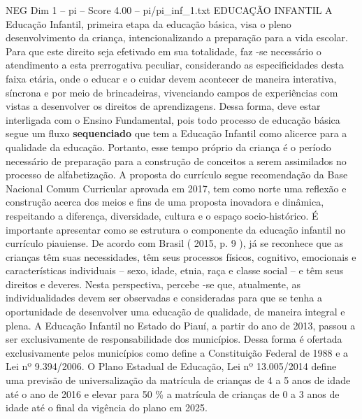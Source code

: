 \begin{textsample}{NEG Dim 1 – pi – Score 4.00 – pi/pi\_inf\_1.txt}  \label{ex:f1_neg_235}
EDUCAÇÃO INFANTIL A Educação Infantil, primeira etapa da educação básica, visa o pleno desenvolvimento da criança, intencionalizando a preparação para a vida escolar.
Para que este direito seja efetivado em sua totalidade, faz -se necessário o atendimento a esta prerrogativa peculiar, considerando as especificidades desta faixa etária, onde o educar e o cuidar devem acontecer de maneira interativa, síncrona e por meio de brincadeiras, vivenciando campos de experiências com vistas a desenvolver os direitos de aprendizagens.
Dessa forma, deve estar interligada com o Ensino Fundamental, pois todo processo de educação básica segue um fluxo \textbf{sequenciado} que tem a Educação Infantil como alicerce para a qualidade da educação.
Portanto, esse tempo próprio da criança é o período necessário de preparação para a construção de conceitos a serem assimilados no processo de alfabetização.
A proposta do currículo segue recomendação da Base Nacional Comum Curricular aprovada em 2017, tem como norte uma reflexão e construção acerca dos meios e fins de uma proposta inovadora e dinâmica, respeitando a diferença, diversidade, cultura e o espaço socio-histórico.
É importante apresentar como se estrutura o componente da educação infantil no currículo piauiense.
De acordo com Brasil ( 2015, p. 9 ), já se reconhece que as crianças têm suas necessidades, têm seus processos físicos, cognitivo, emocionais e características individuais – sexo, idade, etnia, raça e classe social – e têm seus direitos e deveres.
Nesta perspectiva, percebe -se que, atualmente, as individualidades devem ser observadas e consideradas para que se tenha a oportunidade de desenvolver uma educação de qualidade, de maneira integral e plena.
A Educação Infantil no Estado do Piauí, a partir do ano de 2013, passou a ser exclusivamente de responsabilidade dos municípios.
Dessa forma é ofertada exclusivamente pelos municípios como define a Constituição Federal de 1988 e a Lei nº 9.394/2006.
O Plano Estadual de Educação, Lei nº 13.005/2014 define uma previsão de universalização da matrícula de crianças de 4 a 5 anos de idade até o ano de 2016 e elevar para 50 \% a matrícula de crianças de 0 a 3 anos de idade até o final da vigência do plano em 2025.

\end{textsample}
